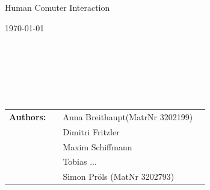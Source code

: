 \begin{center}
	\Large{Human Comuter Interaction}
\end{center}
\begin{center}

\end{center}
\begin{center}
{\large \today\par}
\end{center}
\begin{verbatim}






\end{verbatim}
\begin{flushleft}
\begin{tabular}{llll}
\textbf{Authors:} & & Anna Breithaupt(MatrNr 3202199)\\  &&Dimitri Fritzler\\ &&Maxim Schiffmann\\ &&Tobias ...\\ &&Simon Pröls (MatNr 3202793)
\end{tabular}
\end{flushleft}



